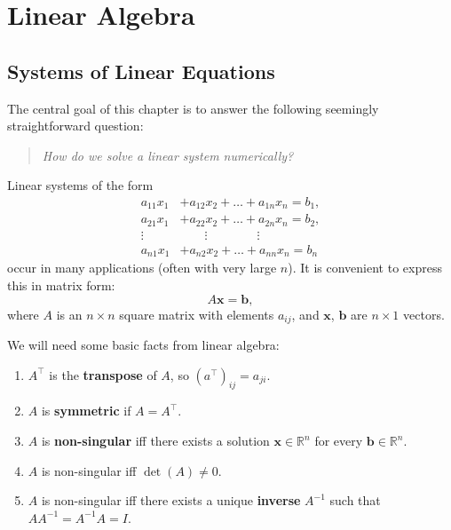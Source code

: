 \documentclass[
  letterpaper,
  DIV=11,
  numbers=noendperiod]{scrreprt}
\begin{document}

\chapter{Linear Algebra}\label{linear-algebra}

\section{Systems of Linear Equations}\label{s-lin}

The central goal of this chapter is to answer the following seemingly
straightforward question:

\begin{quote}
\emph{How do we solve a linear system numerically?}
\end{quote}

Linear systems of the form \[
\begin{aligned}
a_{11}x_1 &+ a_{12}x_2 + \ldots + a_{1n}x_n = b_1,\\
a_{21}x_1 &+ a_{22}x_2 + \ldots + a_{2n}x_n = b_2,\\
\vdots    &\qquad\vdots\qquad\qquad\vdots\\
a_{n1}x_1 &+ a_{n2}x_2 + \ldots + a_{nn}x_n = b_n
\end{aligned}
\] occur in many applications (often with very large \(n\)). It is
convenient to express this in matrix form: \[
A\mathbf{x} = \mathbf{b},
\] where \(A\) is an \(n\times n\) square matrix with elements
\(a_{ij}\), and \(\mathbf{x}\), \(\mathbf{b}\) are \(n\times 1\)
vectors.

We will need some basic facts from linear algebra:

\begin{enumerate}
\def\labelenumi{\arabic{enumi}.}
\item
  \(A^\top\) is the \textbf{transpose} of \(A\), so
  \((a^\top)_{ij} = a_{ji}\).
\item
  \(A\) is \textbf{symmetric} if \(A=A^\top\).
\item
  \(A\) is \textbf{non-singular} iff there exists a solution
  \(\mathbf{x}\in\mathbb{R}^n\) for every \(\mathbf{b}\in\mathbb{R}^n\).
\item
  \(A\) is non-singular iff \(\det(A)\neq 0\).
\item
  \(A\) is non-singular iff there exists a unique \textbf{inverse}
  \(A^{-1}\) such that \(AA^{-1}=A^{-1}A = I\).
\end{enumerate}
\end{document}
